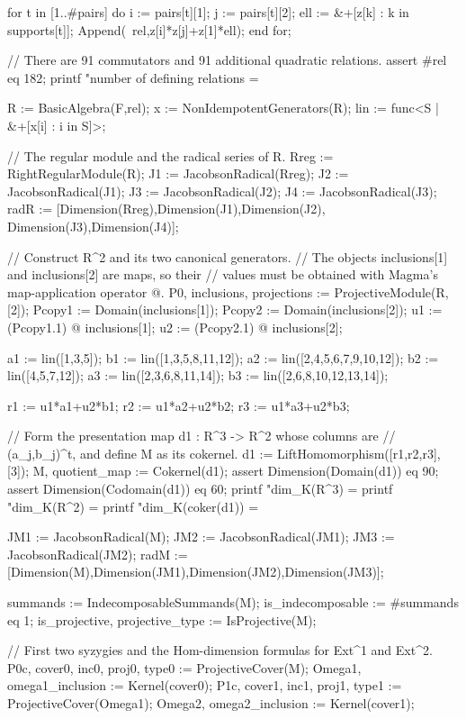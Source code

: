 \documentclass[a4paper]{amsart}
\theoremstyle{definition}
\theoremstyle{remark}
\numberwithin{equation}{section}
\begin{document}
\begin{MagmaCode}
for t in [1..#pairs] do
    i := pairs[t][1];
    j := pairs[t][2];
    ell := &+[z[k] : k in supports[t]];
    Append(~rel,z[i]*z[j]+z[1]*ell);
end for;

// There are 91 commutators and 91 additional quadratic relations.
assert #rel eq 182;
printf "number of defining relations  = %

R := BasicAlgebra(F,rel);
x := NonIdempotentGenerators(R);
lin := func<S | &+[x[i] : i in S]>;

// The regular module and the radical series of R.
Rreg := RightRegularModule(R);
J1 := JacobsonRadical(Rreg);
J2 := JacobsonRadical(J1);
J3 := JacobsonRadical(J2);
J4 := JacobsonRadical(J3);
radR := [Dimension(Rreg),Dimension(J1),Dimension(J2),
         Dimension(J3),Dimension(J4)];

// Construct R^2 and its two canonical generators.
// The objects inclusions[1] and inclusions[2] are maps, so their
// values must be obtained with Magma's map-application operator @.
P0, inclusions, projections := ProjectiveModule(R,[2]);
Pcopy1 := Domain(inclusions[1]);
Pcopy2 := Domain(inclusions[2]);
u1 := (Pcopy1.1) @ inclusions[1];
u2 := (Pcopy2.1) @ inclusions[2];

a1 := lin([1,3,5]);
b1 := lin([1,3,5,8,11,12]);
a2 := lin([2,4,5,6,7,9,10,12]);
b2 := lin([4,5,7,12]);
a3 := lin([2,3,6,8,11,14]);
b3 := lin([2,6,8,10,12,13,14]);

r1 := u1*a1+u2*b1;
r2 := u1*a2+u2*b2;
r3 := u1*a3+u2*b3;

// Form the presentation map d1 : R^3 -> R^2 whose columns are
// (a_j,b_j)^t, and define M as its cokernel.
d1 := LiftHomomorphism([r1,r2,r3],[3]);
M, quotient_map := Cokernel(d1);
assert Dimension(Domain(d1)) eq 90;
assert Dimension(Codomain(d1)) eq 60;
printf "dim_K(R^3)                   = %
printf "dim_K(R^2)                   = %
printf "dim_K(coker(d1))             = %

JM1 := JacobsonRadical(M);
JM2 := JacobsonRadical(JM1);
JM3 := JacobsonRadical(JM2);
radM := [Dimension(M),Dimension(JM1),Dimension(JM2),Dimension(JM3)];

summands := IndecomposableSummands(M);
is_indecomposable := #summands eq 1;
is_projective, projective_type := IsProjective(M);

// First two syzygies and the Hom-dimension formulas for Ext^1 and Ext^2.
P0c, cover0, inc0, proj0, type0 := ProjectiveCover(M);
Omega1, omega1_inclusion := Kernel(cover0);
P1c, cover1, inc1, proj1, type1 := ProjectiveCover(Omega1);
Omega2, omega2_inclusion := Kernel(cover1);


\end{MagmaCode}
\end{document}
